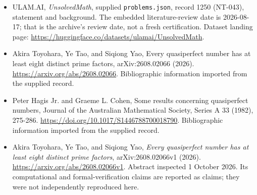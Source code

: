 \documentclass[11pt,a4paper]{article}
\begin{document}
{\small

\begin{itemize}

\item[\hypertarget{source:1250:1}{S1}] ULAM.AI, \emph{UnsolvedMath}, supplied \texttt{problems.json}, record 1250 (NT-043), statement and background. The embedded literature-review date is 2026-08-17; that is the archive’s review date, not a fresh certification. Dataset landing page: \url{https://huggingface.co/datasets/ulamai/UnsolvedMath}.

\item[\hypertarget{source:1250:2}{S2}] Akira Toyohara, Ye Tao, and Siqiong Yao, Every quasiperfect number has at least eight distinct prime factors, arXiv:2608.02066 (2026). \url{https://arxiv.org/abs/2608.02066}. Bibliographic information imported from the supplied record.

\item[\hypertarget{source:1250:3}{S3}] Peter Hagis Jr. and Graeme L. Cohen, Some results concerning quasiperfect numbers, Journal of the Australian Mathematical Society, Series A 33 (1982), 275-286. \url{https://doi.org/10.1017/S1446788700018790}. Bibliographic information imported from the supplied record.


\item[E1] Akira Toyohara, Ye Tao, and Siqiong Yao,
\emph{Every quasiperfect number has at least eight distinct prime
factors}, arXiv:2608.02066v1 (2026).
\url{https://arxiv.org/abs/2608.02066v1}. Abstract inspected
1 October 2026. Its computational and formal-verification claims are
reported as claims; they were not independently reproduced here.

\end{itemize}

}

\label{end:1250}
\end{document}
